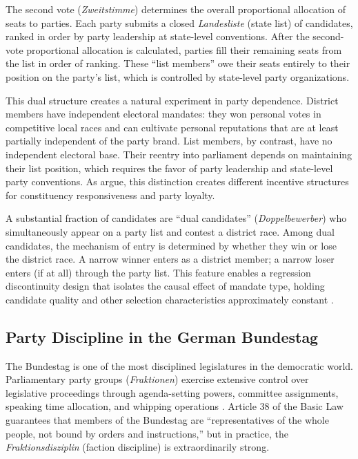 \documentclass[12pt]{article}
\begin{document}
The second vote (\textit{Zweitstimme}) determines the overall proportional allocation of seats to parties. Each party submits a closed \textit{Landesliste} (state list) of candidates, ranked in order by party leadership at state-level conventions. After the second-vote proportional allocation is calculated, parties fill their remaining seats from the list in order of ranking. These ``list members'' owe their seats entirely to their position on the party's list, which is controlled by state-level party organizations.

This dual structure creates a natural experiment in party dependence. District members have independent electoral mandates: they won personal votes in competitive local races and can cultivate personal reputations that are at least partially independent of the party brand. List members, by contrast, have no independent electoral base. Their reentry into parliament depends on maintaining their list position, which requires the favor of party leadership and state-level party conventions. As \citet{bawn1999} argue, this distinction creates different incentive structures for constituency responsiveness and party loyalty.

A substantial fraction of candidates are ``dual candidates'' (\textit{Doppelbewerber}) who simultaneously appear on a party list and contest a district race. Among dual candidates, the mechanism of entry is determined by whether they win or lose the district race. A narrow winner enters as a district member; a narrow loser enters (if at all) through the party list. This feature enables a regression discontinuity design that isolates the causal effect of mandate type, holding candidate quality and other selection characteristics approximately constant \citep{ohmura2021, sieberer2020}.

\subsection{Party Discipline in the German Bundestag}

The Bundestag is one of the most disciplined legislatures in the democratic world. Parliamentary party groups (\textit{Fraktionen}) exercise extensive control over legislative proceedings through agenda-setting powers, committee assignments, speaking time allocation, and whipping operations \citep{saalfeld2003, sieberer2015}. Article 38 of the Basic Law guarantees that members of the Bundestag are ``representatives of the whole people, not bound by orders and instructions,'' but in practice, the \textit{Fraktionsdisziplin} (faction discipline) is extraordinarily strong.
\end{document}
